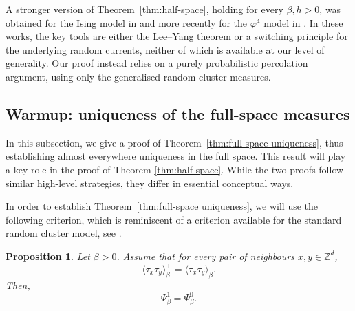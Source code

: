 \documentclass[11pt,a4paper]{article}
\numberwithin{equation}{section}
\theoremstyle{plain}
\newtheorem{Prop}[Thm]{Proposition}
\theoremstyle{definition}
\begin{document}
A stronger version of Theorem~\ref{thm:half-space}, holding for every 
$\beta, h > 0$, was obtained for the Ising model in \cite{frohlich1987semi} 
and more recently for the $\varphi^4$ model in \cite{gunaratnam2025supercritical}. 
In these works, the key tools are either the Lee--Yang theorem or a switching 
principle for the underlying random currents, neither of which is available 
at our level of generality. Our proof instead relies on a purely probabilistic 
percolation argument, using only the generalised random cluster measures.


\subsection{Warmup: uniqueness of the full-space measures}

In this subsection, we give a proof of Theorem~\ref{thm:full-space uniqueness}, thus establishing almost everywhere uniqueness in the full space.
This result will play a key role in the proof of Theorem \ref{thm:half-space}. While the two proofs follow similar high-level strategies, they differ in essential conceptual ways.


In order to establish Theorem~\ref{thm:full-space uniqueness}, we will use the following criterion, which is reminiscent of a criterion available for the standard random cluster model, see \cite[Theorem~4.63]{Grimmett2006RCM}.
\begin{Prop}\label{prop: two-pt classification}
Let $\beta > 0$. Assume that for every pair of neighbours $x,y \in \mathbb Z^d$,
\begin{equation} \label{eq: 2pt fcn equality}
\langle \tau_x \tau_y\rangle_\beta^+ = \langle \tau_x \tau_y \rangle_\beta. 
\end{equation}
Then,
\begin{equation}
\Psi^1_\beta = \Psi^0_\beta.
\end{equation}
\end{Prop}
\end{document}
